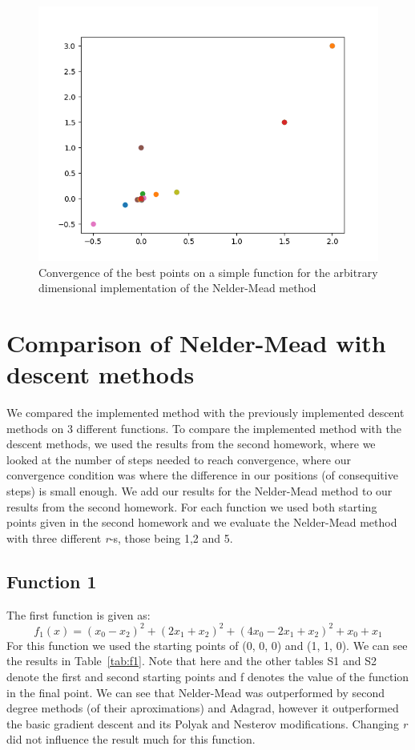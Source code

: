 \documentclass[9pt]{IEEEtran}
\begin{document}
\begin{figure}[h]
    \includegraphics[width=\columnwidth]{convergence1.png}
    \caption{Convergence of the best points on a simple function 
    for the arbitrary dimensional implementation of the Nelder-Mead method}
    \label{fig:nelder}
\end{figure}

\section{Comparison of Nelder-Mead with descent methods}
We compared the implemented method with the previously implemented descent 
methods on 3 different functions. To compare the implemented method with the descent 
methods, we used the results from the second homework, where we looked at the number 
of steps needed to reach convergence, where our convergence condition was 
where the difference in our
positions (of consequitive steps) is small enough. We add our results for 
the Nelder-Mead method to our results from the second homework. For each function 
we used both starting points given in the second homework
 and we evaluate the Nelder-Mead method with three 
different \textit{r}-s, those being 1,2 and 5.

\subsection*{Function 1}
The first function is given as:
\[
f_1(x) = (x_0 - x_2)^2 + (2x_1 + x_2)^2 + (4x_0 - 2x_1 + x_2)^2 + x_0 + x_1
\]
For this function we used the starting points of (0, 0, 0) and (1, 1, 0).
We can see the results in Table~\ref{tab:f1}. Note that here and the other tables
S1 and S2 denote the first and second starting points and f denotes the value of 
the function in the final point. We can see that 
Nelder-Mead was outperformed by second degree methods (of their aproximations) and 
Adagrad, however it outperformed the basic gradient descent and its Polyak and 
Nesterov modifications. Changing \textit{r} did not influence the result much 
for this function.
\end{document}
